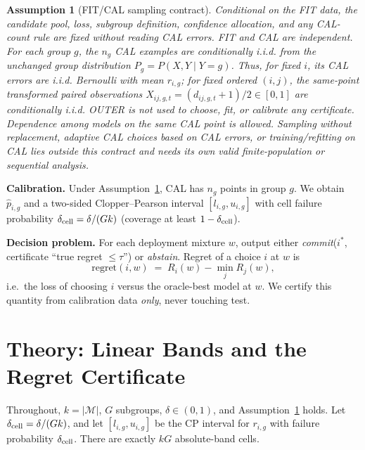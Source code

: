 \documentclass{article}
\newtheorem{assumption}{Assumption}
\begin{document}
\begin{assumption}[FIT/CAL sampling contract]
\label{ass:cal}
Conditional on the FIT data, the candidate pool, loss, subgroup definition, confidence
allocation, and any CAL-count rule are fixed without reading CAL errors. FIT and CAL are
independent. For each group $g$, the $n_g$ CAL examples are conditionally i.i.d. from the
unchanged group distribution $P_g=P(X,Y\mid Y=g)$. Thus, for fixed $i$, its CAL errors are
i.i.d. Bernoulli with mean $r_{i,g}$; for fixed ordered $(i,j)$, the same-point transformed
paired observations $X_{ij,g,t}=(d_{ij,g,t}+1)/2\in[0,1]$ are conditionally i.i.d. OUTER is
not used to choose, fit, or calibrate any certificate. Dependence among models on the same
CAL point is allowed. Sampling without replacement, adaptive CAL choices based on CAL errors,
or training/refitting on CAL lies outside this contract and needs its own valid finite-population
or sequential analysis.
\end{assumption}

\textbf{Calibration.} Under Assumption~\ref{ass:cal}, CAL has $n_g$ points in group $g$.
We obtain $\hat p_{i,g}$ and a two-sided Clopper--Pearson interval $[l_{i,g},u_{i,g}]$ with
cell failure probability $\delta_{\rm cell}=\delta/(Gk)$ (coverage at least
$1-\delta_{\rm cell}$).

\textbf{Decision problem.} For each deployment mixture $w$, output either
\emph{commit}($i^*$, certificate ``true regret $\le\tau$'') or \emph{abstain}. Regret of a
choice $i$ at $w$ is
\[
  \mathrm{regret}(i,w) \;=\; R_i(w)-\min_{j} R_j(w),
\]
i.e.\ the loss of choosing $i$ versus the oracle-best model at $w$. We certify this quantity
from calibration data \emph{only}, never touching test.

\section{Theory: Linear Bands and the Regret Certificate}
\label{sec:theory}

Throughout, $k=|\mathcal{M}|$, $G$ subgroups, $\delta\in(0,1)$, and
Assumption~\ref{ass:cal} holds. Let $\delta_{\rm cell}=\delta/(G k)$, and let
$[l_{i,g},u_{i,g}]$ be the CP interval for $r_{i,g}$ with failure probability
$\delta_{\rm cell}$. There are exactly $kG$ absolute-band cells.
\end{document}
